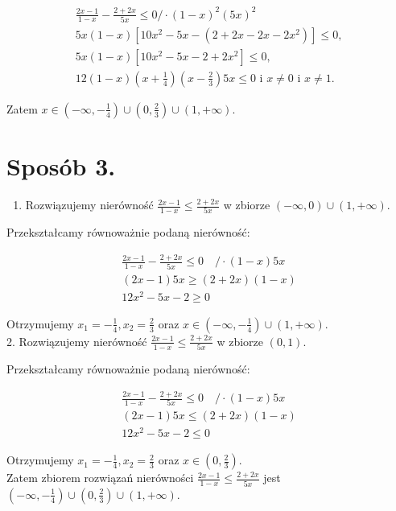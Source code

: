 \documentclass[10pt]{article}
\begin{document}
$$
\begin{gathered}
\frac{2 x-1}{1-x}-\frac{2+2 x}{5 x} \leq 0 / \cdot(1-x)^{2}(5 x)^{2} \\
5 x(1-x)\left[10 x^{2}-5 x-\left(2+2 x-2 x-2 x^{2}\right)\right] \leq 0, \\
5 x(1-x)\left[10 x^{2}-5 x-2+2 x^{2}\right] \leq 0, \\
12(1-x)\left(x+\frac{1}{4}\right)\left(x-\frac{2}{3}\right) 5 x \leq 0 \text { i } x \neq 0 \text { i } x \neq 1 .
\end{gathered}
$$

Zatem $x \in\left(-\infty,-\frac{1}{4}\right) \cup\left(0, \frac{2}{3}\right) \cup(1,+\infty)$.

\section*{Sposób 3.}
\begin{enumerate}
  \item Rozwiązujemy nierówność $\frac{2 x-1}{1-x} \leq \frac{2+2 x}{5 x}$ w zbiorze $(-\infty, 0) \cup(1,+\infty)$.
\end{enumerate}

Przekształcamy równoważnie podaną nierówność:

$$
\begin{gathered}
\frac{2 x-1}{1-x}-\frac{2+2 x}{5 x} \leq 0 \quad / \cdot(1-x) 5 x \\
(2 x-1) 5 x \geq(2+2 x)(1-x) \\
12 x^{2}-5 x-2 \geq 0
\end{gathered}
$$

Otrzymujemy $x_{1}=-\frac{1}{4}, x_{2}=\frac{2}{3}$ oraz $x \in\left(-\infty,-\frac{1}{4}\right) \cup(1,+\infty)$.\\
2. Rozwiązujemy nierówność $\frac{2 x-1}{1-x} \leq \frac{2+2 x}{5 x}$ w zbiorze $(0,1)$.

Przekształcamy równoważnie podaną nierówność:

$$
\begin{gathered}
\frac{2 x-1}{1-x}-\frac{2+2 x}{5 x} \leq 0 \quad / \cdot(1-x) 5 x \\
(2 x-1) 5 x \leq(2+2 x)(1-x) \\
12 x^{2}-5 x-2 \leq 0
\end{gathered}
$$

Otrzymujemy $x_{1}=-\frac{1}{4}, x_{2}=\frac{2}{3}$ oraz $x \in\left(0, \frac{2}{3}\right)$.\\
Zatem zbiorem rozwiązań nierówności $\frac{2 x-1}{1-x} \leq \frac{2+2 x}{5 x}$ jest $\left(-\infty,-\frac{1}{4}\right) \cup\left(0, \frac{2}{3}\right) \cup(1,+\infty)$.
\end{document}
